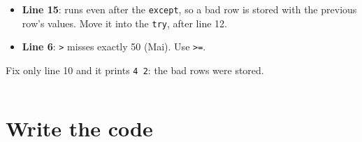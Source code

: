 \documentclass[aspectratio=169]{beamer}
\newcommand{\code}[1]{\texttt{#1}}
\begin{document}
\begin{frame}
\begin{columns}[T,onlytextwidth]
\begin{onlyenv}
\begin{itemize}[itemsep=0.25em, leftmargin=1em]
            value and the unpacking raises \code{ValueError} \emph{outside} the
            \code{try}: crash. Move line 10 inside the \code{try}.
      \item \textbf{Line 15}: runs even after the \code{except}, so a bad row is
            stored with the previous row's values. Move it into the \code{try},
            after line 12.
      \item \textbf{Line 6}: \code{>} misses exactly 50 (Mai). Use \code{>=}.
    \end{itemize}
    {\footnotesize Fix only line 10 and it prints \code{4 2}: the bad rows were
    stored.}
    \end{onlyenv}
  \end{columns}
\end{frame}

\section{Write the code}
\end{document}
